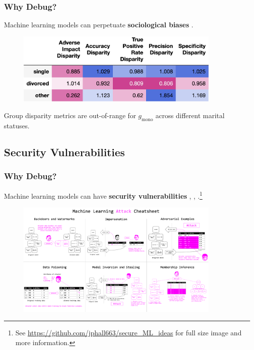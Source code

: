 \documentclass[11pt,
               aspectratio=43,
               hyperref={colorlinks}
               ]{beamer}
\begin{document}
			\begin{frame}
		
				\frametitle{Why Debug?}
		
				\footnotesize{Machine learning models can perpetuate \textbf{sociological biases} \cite{barocas-hardt-narayanan}.}
				\vspace{10pt}	
				\begin{figure}[htb]
					\begin{center}
						\includegraphics[height=100pt]{img/di.png}
					\end{center}
				\end{figure}
				\footnotesize{Group disparity metrics are out-of-range for $g_{\text{mono}}$ across different marital statuses.}
				\normalsize
		
			\end{frame}
	
		\subsection{Security Vulnerabilities}
	
			\begin{frame}
		
				\frametitle{Why Debug?}
		
				\footnotesize{Machine learning models can have \textbf{security vulnerabilities} \cite{security_of_ml}, \cite{membership_inference}, \cite{model_stealing}}.\footnote{\tiny{See \url{https://github.com/jphall663/secure_ML_ideas} for full size image and more information.}}
				\begin{figure}[htb]
					\begin{center}
						\includegraphics[height=160pt]{img/cheatsheet.png}
					\end{center}
				\end{figure}	
				\vspace{-17pt}
				\normalsize
		
			\end{frame}
\end{document}
